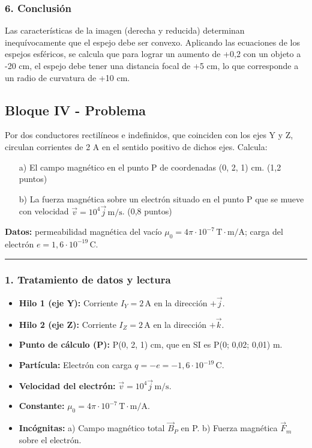 \subsubsection*{6. Conclusión}
\begin{cajaconclusion}
Las características de la imagen (derecha y reducida) determinan inequívocamente que el espejo debe ser convexo. Aplicando las ecuaciones de los espejos esféricos, se calcula que para lograr un aumento de +0,2 con un objeto a -20 cm, el espejo debe tener una distancia focal de +5 cm, lo que corresponde a un radio de curvatura de +10 cm.
\end{cajaconclusion}

\newpage

\subsection{Bloque IV - Problema}
\label{subsec:A4_2010_sep_ext}

\begin{cajaenunciado}
Por dos conductores rectilíneos e indefinidos, que coinciden con los ejes Y y Z, circulan corrientes de 2 A en el sentido positivo de dichos ejes. Calcula:
\begin{enumerate}
    \item[a)] El campo magnético en el punto P de coordenadas (0, 2, 1) cm. (1,2 puntos)
    \item[b)] La fuerza magnética sobre un electrón situado en el punto P que se mueve con velocidad $\vec{v}=10^{4}\vec{j}\,\text{m/s}$. (0,8 puntos)
\end{enumerate}
\textbf{Datos:} permeabilidad magnética del vacío $\mu_{0}=4\pi\cdot10^{-7}\,\text{T}\cdot\text{m/A}$; carga del electrón $e=1,6\cdot10^{-19}\,\text{C}$.
\end{cajaenunciado}
\hrule

\subsubsection*{1. Tratamiento de datos y lectura}
\begin{itemize}
    \item \textbf{Hilo 1 (eje Y):} Corriente $I_Y = 2 \, \text{A}$ en la dirección $+\vec{j}$.
    \item \textbf{Hilo 2 (eje Z):} Corriente $I_Z = 2 \, \text{A}$ en la dirección $+\vec{k}$.
    \item \textbf{Punto de cálculo (P):} P(0, 2, 1) cm, que en SI es P(0; 0,02; 0,01) m.
    \item \textbf{Partícula:} Electrón con carga $q = -e = -1,6 \cdot 10^{-19} \, \text{C}$.
    \item \textbf{Velocidad del electrón:} $\vec{v} = 10^4 \vec{j} \, \text{m/s}$.
    \item \textbf{Constante:} $\mu_0 = 4\pi \cdot 10^{-7} \, \text{T}\cdot\text{m/A}$.
    \item \textbf{Incógnitas:} a) Campo magnético total $\vec{B}_P$ en P. b) Fuerza magnética $\vec{F}_m$ sobre el electrón.
\end{itemize}

